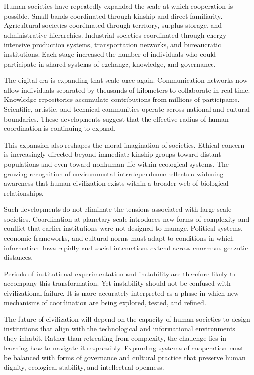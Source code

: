 \documentclass[12pt]{article}
\begin{document}
Human societies have repeatedly expanded the scale at which cooperation is possible. Small bands coordinated through kinship and direct familiarity. Agricultural societies coordinated through territory, surplus storage, and administrative hierarchies. Industrial societies coordinated through energy-intensive production systems, transportation networks, and bureaucratic institutions. Each stage increased the number of individuals who could participate in shared systems of exchange, knowledge, and governance.

The digital era is expanding that scale once again. Communication networks now allow individuals separated by thousands of kilometers to collaborate in real time. Knowledge repositories accumulate contributions from millions of participants. Scientific, artistic, and technical communities operate across national and cultural boundaries. These developments suggest that the effective radius of human coordination is continuing to expand.

This expansion also reshapes the moral imagination of societies. Ethical concern is increasingly directed beyond immediate kinship groups toward distant populations and even toward nonhuman life within ecological systems. The growing recognition of environmental interdependence reflects a widening awareness that human civilization exists within a broader web of biological relationships.

Such developments do not eliminate the tensions associated with large-scale societies. Coordination at planetary scale introduces new forms of complexity and conflict that earlier institutions were not designed to manage. Political systems, economic frameworks, and cultural norms must adapt to conditions in which information flows rapidly and social interactions extend across enormous geozotic distances.

Periods of institutional experimentation and instability are therefore likely to accompany this transformation. Yet instability should not be confused with civilizational failure. It is more accurately interpreted as a phase in which new mechanisms of coordination are being explored, tested, and refined.

The future of civilization will depend on the capacity of human societies to design institutions that align with the technological and informational environments they inhabit. Rather than retreating from complexity, the challenge lies in learning how to navigate it responsibly. Expanding systems of cooperation must be balanced with forms of governance and cultural practice that preserve human dignity, ecological stability, and intellectual openness.
\end{document}
